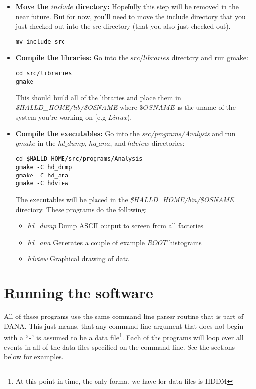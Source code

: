 \documentclass[12pt]{article}
\begin{document}
\begin{itemize}
	\item{\bf Move the $include$ directory:} Hopefully this step will be
	removed in the near future. But for now, you'll need to move the
	include directory that you just checked out into the src directory
	(that you also just checked out).

		\begin{lstlisting}[frame=shadowbox,backgroundcolor=\color{cmdbkgd}]
mv include src
		\end{lstlisting}
	
	\item{\bf Compile the libraries:} Go into the $src/libraries$ directory
	and run gmake:

		\begin{lstlisting}[frame=shadowbox,backgroundcolor=\color{cmdbkgd}]
cd src/libraries
gmake
		\end{lstlisting}

	This should build all of the libraries and place them in
	{\it \$HALLD\_HOME/lib/\$OSNAME} where $\$OSNAME$ is the uname of
	the system you're working on (e.g $Linux$).

	\item{\bf Compile the executables:} Go into the {\it src/programs/Analysis}
	and run $gmake$ in the $hd\_dump$, $hd\_ana$, and $hdview$ directories:

		\begin{lstlisting}[frame=shadowbox,backgroundcolor=\color{cmdbkgd}]
cd $HALLD_HOME/src/programs/Analysis
gmake -C hd_dump
gmake -C hd_ana
gmake -C hdview
		\end{lstlisting}
		
	The executables will be placed in the {\it \$HALLD\_HOME/bin/\$OSNAME}
	directory. These programs do the following:
	\begin{itemize}
		\item{\it hd\_dump} Dump ASCII output to screen from all factories
		\item{\it hd\_ana} Generates a couple of example $ROOT$ histograms
		\item{\it hdview} Graphical drawing of data
	\end{itemize}
	
\end{itemize}

\section{Running the software}
All of these programs use the same command line parser routine
that is part of DANA. This just means, that any command
line argument that does not begin with a ``-'' is assumed to be 
a data file\footnote{At this point in time, the only format we have
for data files is HDDM}. Each of the programs will loop over
all events in all of the data files specified on the command line.
See the sections below for examples.
\end{document}
